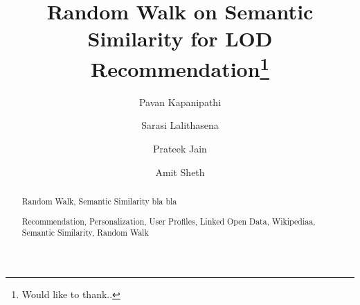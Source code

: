 \documentclass[runningheads,a4paper]{llncs}
\newcommand{\keywords}[1]{\par\addvspace\baselineskip
\noindent\keywordname\enspace\ignorespaces#1}
\begin{document}
\mainmatter  %

\title{Random Walk on Semantic Similarity for LOD Recommendation\thanks{Would like to thank..}}


%
%
%

\author{Pavan Kapanipathi \and Sarasi Lalithasena \and Prateek Jain \and Amit Sheth}



%
%

\maketitle

\begin{abstract}
Random Walk, Semantic Similarity bla bla 

\keywords{Recommendation, Personalization, User Profiles, Linked Open Data, Wikipediaa, Semantic Similarity, Random Walk}
\end{abstract}
%
%
%
%
%




\end{document}
